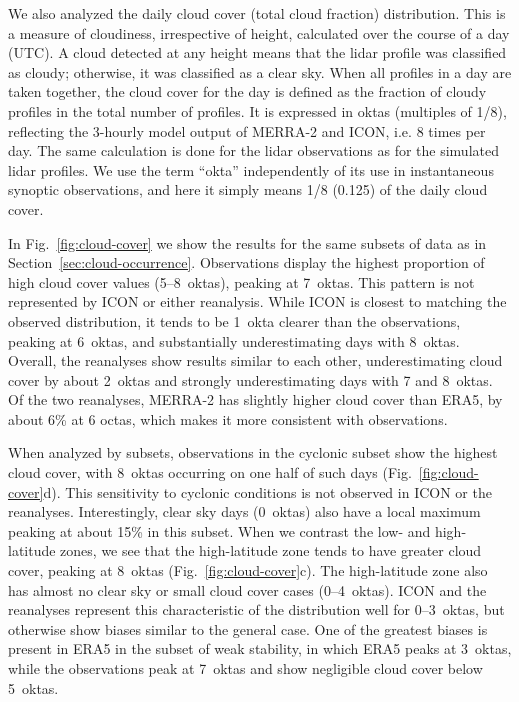\documentclass[draft]{agujournal2019}
\begin{document}
We also analyzed the daily cloud cover (total cloud fraction) distribution. This is a measure of cloudiness, irrespective of height, calculated over the course of a day (UTC). A cloud detected at any height means that the lidar profile was classified as cloudy; otherwise, it was classified as a clear sky. When all profiles in a day are taken together, the cloud cover for the day is defined as the fraction of cloudy profiles in the total number of profiles. It is expressed in oktas (multiples of 1/8), reflecting the 3-hourly model output of MERRA-2 and ICON, i.e. 8 times per day. The same calculation is done for the lidar observations as for the simulated lidar profiles. We use the term ``okta'' independently of its use in instantaneous synoptic observations, and here it simply means 1/8 (0.125) of the daily cloud cover.

In Fig.~\ref{fig:cloud-cover} we show the results for the same subsets of data as in Section~\ref{sec:cloud-occurrence}. Observations display the highest proportion of high cloud cover values (5--8~oktas), peaking at 7~oktas. This pattern is not represented by ICON or either reanalysis. While ICON is closest to matching the observed distribution, it tends to be 1~okta clearer than the observations, peaking at 6~oktas, and substantially underestimating days with 8~oktas. Overall, the reanalyses show results similar to each other, underestimating cloud cover by about 2~oktas and strongly underestimating days with 7 and 8~oktas. Of the two reanalyses, MERRA-2 has slightly higher cloud cover than ERA5, by about 6\% at 6 octas, which makes it more consistent with observations.

When analyzed by subsets, observations in the cyclonic subset show the highest cloud cover, with 8~oktas occurring on one half of such days (Fig.~\ref{fig:cloud-cover}d). This sensitivity to cyclonic conditions is not observed in ICON or the reanalyses. Interestingly, clear sky days (0~oktas) also have a local maximum peaking at about 15\% in this subset. When we contrast the low- and high-latitude zones, we see that the high-latitude zone tends to have greater cloud cover, peaking at 8~oktas (Fig.~\ref{fig:cloud-cover}c). The high-latitude zone also has almost no clear sky or small cloud cover cases (0--4~oktas). ICON and the reanalyses represent this characteristic of the distribution well for 0--3~oktas, but otherwise show biases similar to the general case. One of the greatest biases is present in ERA5 in the subset of weak stability, in which ERA5 peaks at 3~oktas, while the observations peak at 7~oktas and show negligible cloud cover below 5~oktas.
\end{document}
